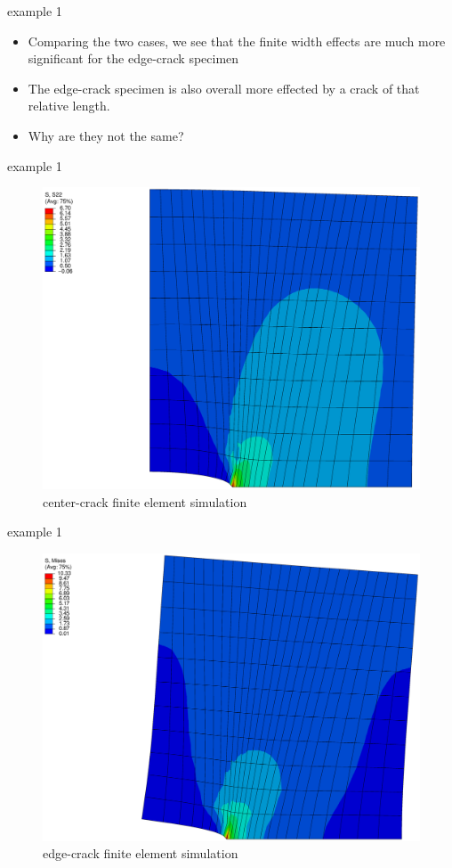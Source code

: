 \documentclass[10pt,handout]{beamer}
\begin{document}
\begin{frame}{example 1}
	\begin{itemize}
		\item Comparing the two cases, we see that the finite width effects are much more significant for the edge-crack specimen
		\item The edge-crack specimen is also overall more effected by a crack of that relative length.
		\item Why are they not the same?
	\end{itemize}
\end{frame}

\begin{frame}{example 1}
	\begin{figure}
	\centering
	\includegraphics[width=0.9\linewidth]{center-crack}
	\caption{center-crack finite element simulation}
	\label{fig:center-crack}
	\end{figure}
\end{frame}

\begin{frame}{example 1}
	\begin{figure}
	\centering
	\includegraphics[width=0.9\linewidth]{edge-crack}
	\caption{edge-crack finite element simulation}
	\label{fig:edge-crack}
	\end{figure}
\end{frame}
\end{document}
